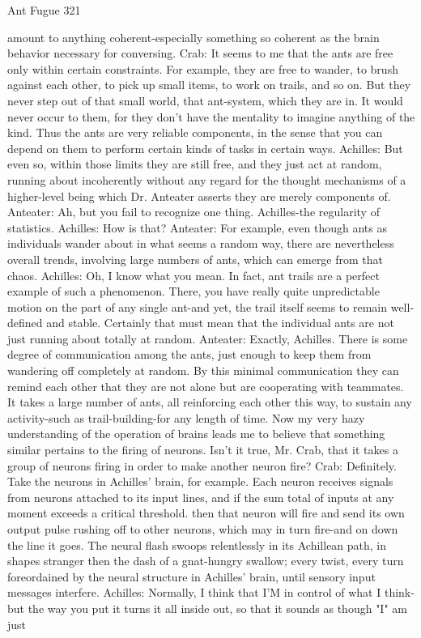 Ant Fugue                                                                                 321

   amount to anything coherent-especially something so coherent as the brain behavior
   necessary for conversing.
Crab: It seems to me that the ants are free only within certain constraints. For example,
   they are free to wander, to brush against each other, to pick up small items, to work
   on trails, and so on. But they never step out of that small world, that ant-system,
   which they are in. It would never occur to them, for they don't have the mentality to
   imagine anything of the kind. Thus the ants are very reliable components, in the
   sense that you can depend on them to perform certain kinds of tasks in certain ways.
Achilles: But even so, within those limits they are still free, and they just act at random,
   running about incoherently without any regard for the thought mechanisms of a
   higher-level being which Dr. Anteater asserts they are merely components of.
Anteater: Ah, but you fail to recognize one thing. Achilles-the regularity of statistics.
Achilles: How is that?
Anteater: For example, even though ants as individuals wander about in what seems a
   random way, there are nevertheless overall trends, involving large numbers of ants,
   which can emerge from that chaos.
Achilles: Oh, I know what you mean. In fact, ant trails are a perfect example of such a
   phenomenon. There, you have really quite unpredictable motion on the part of any
   single ant-and yet, the trail itself seems to remain well-defined and stable. Certainly
   that must mean that the individual ants are not just running about totally at random.
Anteater: Exactly, Achilles. There is some degree of communication among the ants, just
   enough to keep them from wandering off completely at random. By this minimal
   communication they can remind each other that they are not alone but are
   cooperating with teammates. It takes a large number of ants, all reinforcing each
   other this way, to sustain any activity-such as trail-building-for any length of time.
   Now my very hazy understanding of the operation of brains leads me to believe that
   something similar pertains to the firing of neurons. Isn't it true, Mr. Crab, that it takes
   a group of neurons firing in order to make another neuron fire?
Crab: Definitely. Take the neurons in Achilles' brain, for example. Each neuron receives
   signals from neurons attached to its input lines, and if the sum total of inputs at any
   moment exceeds a critical threshold. then that neuron will fire and send its own
   output pulse rushing off to other neurons, which may in turn fire-and on down the
   line it goes. The neural flash swoops relentlessly in its Achillean path, in shapes
   stranger then the dash of a gnat-hungry swallow; every twist, every turn foreordained
   by the neural structure in Achilles' brain, until sensory input messages interfere.
Achilles: Normally, I think that I'M in control of what I think-but the way you put it turns
   it all inside out, so that it sounds as though "I" am just




